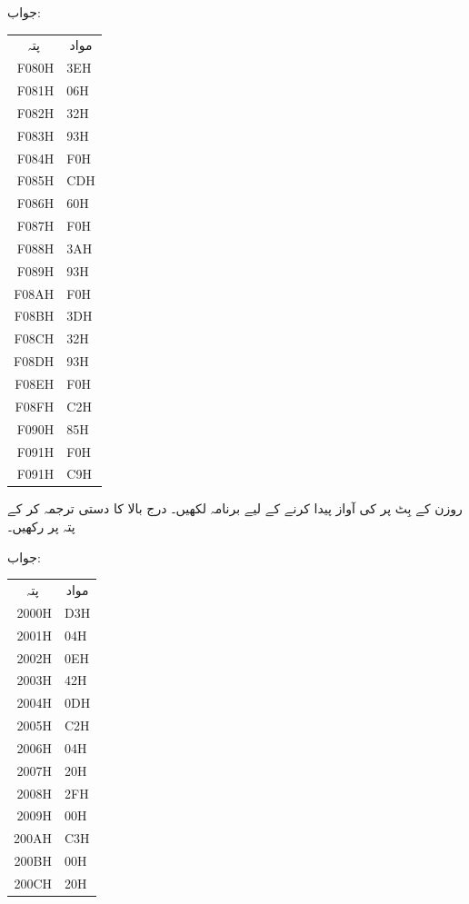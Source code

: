 جواب:
\begin{center}
\begin{tabular}{rl}
\multicolumn{1}{c}{پتہ}&\multicolumn{1}{c}{مواد}\\[1ex]
F080H&3EH\\
F081H&06H\\
F082H&32H\\
F083H&93H\\
F084H&F0H\\
F085H&CDH\\
F086H&60H\\
F087H&F0H\\
F088H&3AH\\
F089H&93H\\
F08AH&F0H\\
F08BH&3DH\\
F08CH&32H\\
F08DH&93H\\
F08EH&F0H\\
F08FH&C2H\\
F090H&85H\\
F091H&F0H\\
F091H&C9H
\end{tabular}
\end{center}
روزن  کے بِٹ  پر   کی آواز پیدا کرنے کے لیے برنامہ لکھیں۔
درج بالا کا دستی ترجمہ کر کے پتہ  پر رکھیں۔

جواب:
\begin{center}
\begin{tabular}{rl}
\multicolumn{1}{c}{پتہ}&\multicolumn{1}{c}{مواد}\\[1ex]
2000H&D3H\\
2001H&04H\\
2002H&0EH\\
2003H&42H\\
2004H&0DH\\
2005H&C2H\\
2006H&04H\\
2007H&20H\\
2008H&2FH\\
2009H&00H\\
200AH&C3H\\
200BH&00H\\
200CH&20H
\end{tabular}
\end{center}

